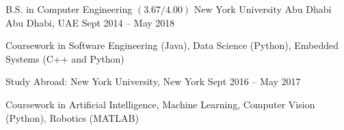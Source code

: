 

\begin{cventries}

  \college
    {B.S. in Computer Engineering $(3.67/4.00)$} %
    {New York University Abu Dhabi } %
    {Abu Dhabi, UAE} %
    {Sept 2014 -- May 2018} %
    {\begin{cvitems}
    \item{Coursework in Software Engineering (Java), Data Science (Python), Embedded Systems (C++ and Python)}
    \end{cvitems}}
    {Study Abroad: New York University, New York}
    {Sept 2016 -- May 2017}
    {\begin{cvitems}
    \item{Coursework in Artificial Intelligence, Machine Learning, Computer Vision (Python), Robotics (MATLAB)} 
    \end{cvitems}
    }
  
\end{cventries}

